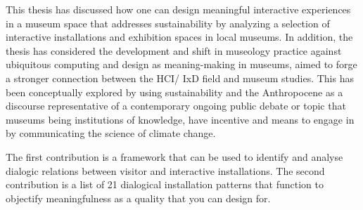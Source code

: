 
This thesis has discussed how one can design meaningful interactive experiences in a museum space that addresses sustainability by analyzing a selection of interactive installations and exhibition spaces in local museums. In addition, the thesis has considered the development and shift in museology practice against ubiquitous computing and design as meaning-making in museums, aimed to forge a stronger connection between the HCI/ IxD field and museum studies. This has been conceptually explored by using sustainability and the Anthropocene as a discourse representative of a contemporary ongoing public debate or topic that museums being institutions of knowledge, have incentive and means to engage in by communicating the science of climate change. 

The first contribution is a framework that can be used to identify and analyse dialogic relations between visitor and interactive installations. The second contribution is a list of 21 dialogical installation patterns that function to objectify meaningfulness as a quality that you can design for.

